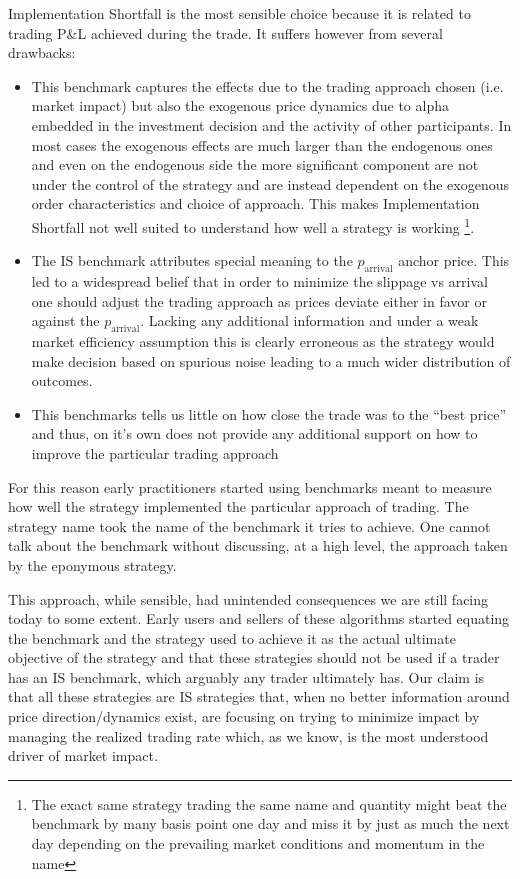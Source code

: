 Implementation Shortfall is the most sensible choice because it is related to trading P\&L achieved during the trade.  It suffers however from several drawbacks:

\begin{itemize}
\item This benchmark captures the effects due to the trading approach chosen (i.e. market impact) but also the exogenous price dynamics due to alpha embedded in the investment decision and the activity of other participants. In most cases the exogenous effects are much larger than the endogenous ones and even on the endogenous side the more significant component are not under the control of the strategy and are instead dependent on the exogenous order characteristics and choice of approach. This makes Implementation Shortfall not well suited to understand how well a strategy is working \footnote{The exact same strategy trading the same name and quantity might beat the benchmark by many basis point one day and miss it by just as much the next day depending on the prevailing market conditions and momentum in the name}.

\item The IS benchmark attributes special meaning to the $p_{\text{arrival}}$ anchor price. This led to a widespread belief that in order to minimize the slippage vs arrival one should adjust the trading approach as prices deviate either in favor or against the   $p_{\text{arrival}}$. Lacking any additional information and under a weak market efficiency assumption this is clearly erroneous as the strategy would make decision based on spurious noise leading to a much wider distribution of outcomes.

\item This benchmarks tells us little on how close the trade was to the ``best price'' and thus, on it's own does not provide any additional support on how to improve the particular trading approach
\end{itemize}


For this reason early practitioners started using benchmarks meant to measure how well the strategy implemented the particular approach of trading. The strategy name took the name of the benchmark it tries to achieve. One cannot talk about the benchmark without discussing, at a high level, the approach taken by the  eponymous strategy.


This approach, while sensible, had unintended consequences we are still facing today to some extent. Early users and sellers of these algorithms started equating the benchmark and the strategy used to achieve it as the actual ultimate objective of the strategy and that these strategies should not be used if a trader has an IS benchmark, which arguably any trader ultimately has. Our claim is that all these strategies are IS strategies that, when no better information around price direction/dynamics exist, are focusing on trying to minimize impact by managing the realized trading rate which, as we know, is the most understood driver of market impact.


